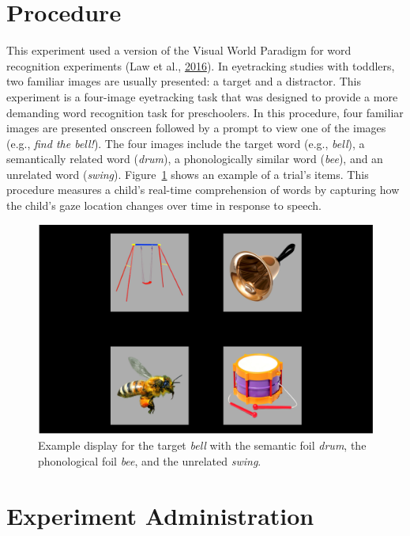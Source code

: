 \documentclass [11pt, proquest] {uwthesis}[2015/03/03]
\begin{document}
\section{Procedure}\label{procedure}

This experiment used a version of the Visual World Paradigm for word
recognition experiments (Law et al.,
\protect\hyperlink{ref-RWLPaper}{2016}). In eyetracking studies with
toddlers, two familiar images are usually presented: a target and a
distractor. This experiment is a four-image eyetracking task that was
designed to provide a more demanding word recognition task for
preschoolers. In this procedure, four familiar images are presented
onscreen followed by a prompt to view one of the images (e.g.,
\emph{find the bell!}). The four images include the target word (e.g.,
\emph{bell}), a semantically related word (\emph{drum}), a
phonologically similar word (\emph{bee}), and an unrelated word
(\emph{swing}). Figure~\ref{fig:sample-vw-screen} shows an example of a
trial's items. This procedure measures a child's real-time comprehension
of words by capturing how the child's gaze location changes over time in
response to speech.




\begin{figure}
\includegraphics[width=1\linewidth]{./misc/rwl-screens/TimePoint1/actual/Block2_17_swing2_bell2_bee2_drum2_UpperRightImage_bell} \caption{Example display for the target \emph{bell}
with the semantic foil \emph{drum}, the phonological foil \emph{bee},
and the unrelated \emph{swing}.}\label{fig:sample-vw-screen}
\end{figure}
\section{Experiment Administration}\label{experiment-administration}
\end{document}
